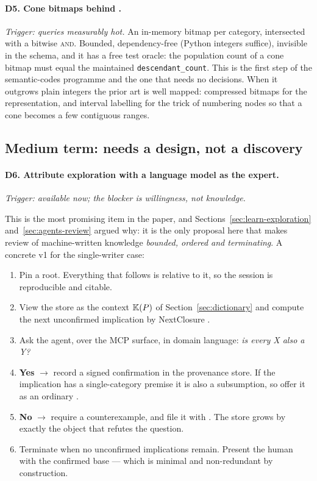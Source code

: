 \paragraph{D5. Cone bitmaps behind .} \emph{Trigger: queries
measurably hot.} An in-memory bitmap per category, intersected with a bitwise
\textsc{and}. Bounded, dependency-free (Python integers suffice), invisible in
the schema, and it has a free test oracle: the population count of a cone
bitmap must equal the maintained \verb|descendant_count|. This is the first
step of the semantic-codes programme and the one that needs no decisions. When
it outgrows plain integers the prior art is well mapped: compressed bitmaps
\citep{lemire2018} for the representation, and interval labelling
\citep{agrawal1989} for the trick of numbering nodes so that a cone becomes a
few contiguous ranges.

\subsection{Medium term: needs a design, not a discovery}

\paragraph{D6. Attribute exploration with a language model as the expert.}
\label{sec:dir-exploration}
\emph{Trigger: available now; the blocker is willingness, not knowledge.}

This is the most promising item in the paper, and
Sections~\ref{sec:learn-exploration} and~\ref{sec:agents-review} argued why:
it is the only proposal here that makes review of machine-written knowledge
\emph{bounded, ordered and terminating}. A concrete v1 for the single-writer
case:

\begin{enumerate}[leftmargin=1.7em,itemsep=1pt]
\item Pin a root. Everything that follows is relative to it, so the session is
  reproducible and citable.
\item View the store as the context $\mathbb{K}(P)$ of Section~\ref{sec:dictionary}
  and compute the next unconfirmed implication by NextClosure
  \citep{ganter1984}.
\item Ask the agent, over the MCP surface, in domain language: \emph{is every
  X also a Y?}
\item \textbf{Yes} $\to$ record a signed confirmation in the provenance store.
  If the implication has a single-category premise it is also a subsumption,
  so offer it as an ordinary .
\item \textbf{No} $\to$ require a counterexample, and file it with .
  The store grows by exactly the object that refutes the question.
\item Terminate when no unconfirmed implications remain. Present the human
  with the confirmed base --- which is minimal and non-redundant by
  construction.
\end{enumerate}

